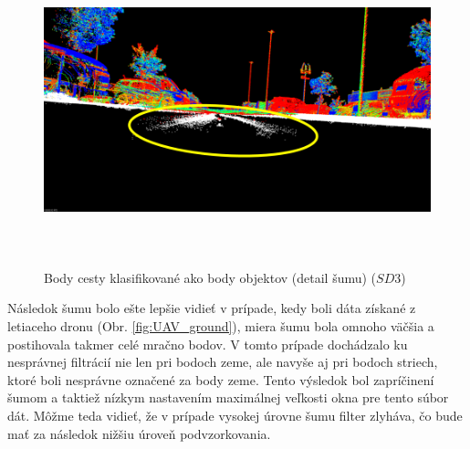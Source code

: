 \begin{figure}[!htbp]
  \centering
  \includegraphics[width=16cm, height=9cm]{img/Parking_ground_detail.png}
  \caption{Body cesty klasifikované ako body objektov (detail šumu) ($SD3$)} 
  \label{fig:Parking_ground_detail}
\end{figure}

\indent Následok šumu bolo ešte lepšie vidieť v prípade, kedy boli dáta získané z letiaceho dronu (Obr. \ref{fig:UAV_ground}), miera šumu bola omnoho väčšia a postihovala takmer celé mračno bodov. V tomto prípade dochádzalo ku nesprávnej filtrácií nie len pri bodoch zeme, ale navyše aj pri bodoch striech, ktoré boli nesprávne označené za body zeme. Tento výsledok bol zapríčinení šumom a taktiež nízkym nastavením maximálnej veľkosti okna pre tento súbor dát. Môžme teda vidieť, že v prípade vysokej úrovne šumu filter zlyháva, čo bude mať za následok nižšiu úroveň podvzorkovania. 

